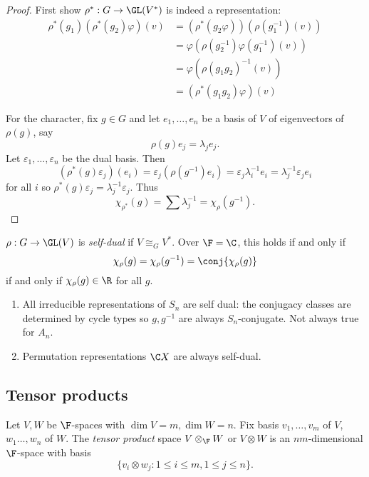 \documentclass[a4paper]{article}
\theoremstyle{definition}
\begin{document}
\begin{proof}
  First show \(\rho^*: G \to \GL(V^*)\) is indeed a representation:
  \begin{align*}
    \rho^*(g_1) (\rho^*(g_2) \varphi)(v)
    &= (\rho^*(g_2\varphi)) (\rho(g_1^{-1}) (v)) \\
    &= \varphi(\rho(g_2^{-1}) \varphi(g_1^{-1})(v)) \\
    &= \varphi(\rho(g_1g_2)^{-1} (v)) \\
    &= (\rho^*(g_1g_2) \varphi)(v)
  \end{align*}

  For the character, fix \(g \in G\) and let \(e_1, \dots, e_n\) be a basis of \(V\) of eigenvectors of \(\rho(g)\), say
  \[
    \rho(g) e_j = \lambda_j e_j.
  \]
  Let \(\varepsilon_1, \dots, \varepsilon_n\) be the dual basis. Then
  \[
    (\rho^*(g) \varepsilon_j)(e_i)
    = \varepsilon_j (\rho(g^{-1}) e_i)
    = \varepsilon_j \lambda_i^{-1} e_i
    = \lambda_j^{-1} \varepsilon_j e_i
  \]
  for all \(i\) so \(\rho^*(g) \varepsilon_j = \lambda_j^{-1} \varepsilon_j\). Thus
  \[
    \chi_{\rho^*}(g) = \sum \lambda_j^{-1} = \chi_\rho (g^{-1}).
  \]
\end{proof}

\begin{definition}
  \(\rho: G \to \GL(V)\) is \emph{self-dual} if \(V \cong_G V^*\). Over \(\F = \C\), this holds if and only if
  \[
    \chi_\rho(g) = \chi_\rho(g^{-1}) = \conj{\chi_\rho(g)}
  \]
  if and only if \(\chi_\rho(g) \in \R\) for all \(g\).
\end{definition}

\begin{eg}\leavevmode
  \begin{enumerate}
  \item All irreducible representations of \(S_n\) are self dual: the conjugacy classes are determined by cycle types so \(g, g^{-1}\) are always \(S_n\)-conjugate. Not always true for \(A_n\).
  \item Permutation representations \(\C X\) are always self-dual.
  \end{enumerate}
\end{eg}

\subsection{Tensor products}

\begin{definition}
  Let \(V, W\) be \(\F\)-spaces with \(\dim V = m, \dim W = n\). Fix basis \(v_1, \dots, v_m\) of \(V\), \(w_1 \dots, w_n\) of \(W\). The \emph{tensor product} space \(V \otimes_\F W\) or \(V \otimes W\) is an \(nm\)-dimensional \(\F\)-space with basis
  \[
    \{v_i \otimes w_j: 1 \leq i \leq m, 1 \leq j \leq n \}.
  \]
\end{definition}
\end{document}
